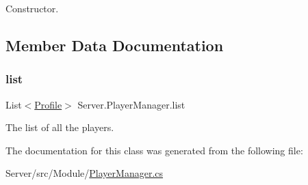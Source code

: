 Constructor. 

\subsection{Member Data Documentation}
\mbox{\label{class_server_1_1_player_manager_a3d02ffa92ec11e6b289c1fb2e60b7a9c}} 
\subsubsection{\texorpdfstring{list}{list}}
{\footnotesize\ttfamily List$<$\hyperlink{class_server_1_1_profile}{Profile}$>$ Server.\+Player\+Manager.\+list}

The list of all the players. 

The documentation for this class was generated from the following file\+:\begin{DoxyCompactItemize}
\item 
Server/src/\+Module/\hyperlink{_player_manager_8cs}{Player\+Manager.\+cs}\end{DoxyCompactItemize}
